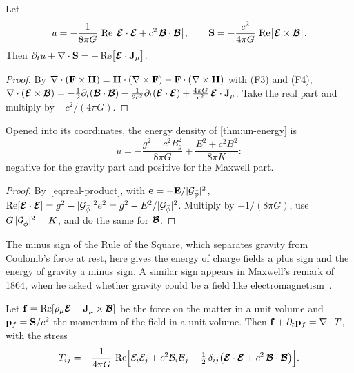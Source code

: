 \begin{theorem}\label{thm:un-energy}
Let
\[
u = -\frac{1}{8\pi G}\,\operatorname{Re}\bigl[\boldsymbol{\mathcal{E}}\cdot\boldsymbol{\mathcal{E}} + c^2\,\boldsymbol{\mathcal{B}}\cdot\boldsymbol{\mathcal{B}}\bigr], \qquad \mathbf{S} = -\frac{c^2}{4\pi G}\,\operatorname{Re}\bigl[\boldsymbol{\mathcal{E}}\times\boldsymbol{\mathcal{B}}\bigr].
\]
Then $\partial_t u + \nabla\cdot\mathbf{S} = -\operatorname{Re}\bigl[\boldsymbol{\mathcal{E}}\cdot\mathbf{J}_\mu\bigr]$.
\end{theorem}

\begin{proof}
By $\nabla\cdot(\mathbf{F}\times\mathbf{H}) = \mathbf{H}\cdot(\nabla\times\mathbf{F}) - \mathbf{F}\cdot(\nabla\times\mathbf{H})$ with (F3) and (F4),
$\nabla\cdot(\boldsymbol{\mathcal{E}}\times\boldsymbol{\mathcal{B}}) = -\tfrac12\partial_t(\boldsymbol{\mathcal{B}}\cdot\boldsymbol{\mathcal{B}}) - \tfrac{1}{2c^2}\partial_t(\boldsymbol{\mathcal{E}}\cdot\boldsymbol{\mathcal{E}}) + \tfrac{4\pi G}{c^2}\,\boldsymbol{\mathcal{E}}\cdot\mathbf{J}_\mu$. Take the real part and multiply by $-c^2/(4\pi G)$.
\end{proof}

\begin{proposition}\label{prop:un-two-faces}
Opened into its coordinates, the energy density of \cref{thm:un-energy} is
\[
u = -\frac{g^2 + c^2 B_g^2}{8\pi G} + \frac{E^2 + c^2 B^2}{8\pi K} :
\]
negative for the gravity part and positive for the Maxwell part.
\end{proposition}

\begin{proof}
By~\cref{eq:real-product}, with $\mathbf{e} = -\mathbf{E}/\lvert\mathcal{G}_{\bar{\phi}}\rvert^2$, $\operatorname{Re}[\boldsymbol{\mathcal{E}}\cdot\boldsymbol{\mathcal{E}}] = g^2 - \lvert\mathcal{G}_{\bar{\phi}}\rvert^2 e^2 = g^2 - E^2/\lvert\mathcal{G}_{\bar{\phi}}\rvert^2$. Multiply by $-1/(8\pi G)$, use $G\,\lvert\mathcal{G}_{\bar{\phi}}\rvert^2 = K$, and do the same for $\boldsymbol{\mathcal{B}}$.
\end{proof}

The minus sign of the Rule of the Square, which separates gravity from Coulomb's force at rest, here gives the energy of charge fields a plus sign and the energy of gravity a minus sign. A similar sign appears in Maxwell's remark of 1864, when he asked whether gravity could be a field like electromagnetism~\citep{Maxwell1865}.

\begin{theorem}\label{thm:un-momentum}
Let $\mathbf{f} = \operatorname{Re}[\rho_\mu\boldsymbol{\mathcal{E}} + \mathbf{J}_\mu\times\boldsymbol{\mathcal{B}}]$ be the force on the matter in a unit volume and $\mathbf{p}_f = \mathbf{S}/c^2$ the momentum of the field in a unit volume. Then $\mathbf{f} + \partial_t\mathbf{p}_f = \nabla\cdot T$, with the stress
\[
T_{ij} = -\frac{1}{4\pi G}\,\operatorname{Re}\Bigl[\mathcal{E}_i\mathcal{E}_j + c^2\mathcal{B}_i\mathcal{B}_j - \tfrac12\,\delta_{ij}\bigl(\boldsymbol{\mathcal{E}}\cdot\boldsymbol{\mathcal{E}} + c^2\,\boldsymbol{\mathcal{B}}\cdot\boldsymbol{\mathcal{B}}\bigr)\Bigr] .
\]
\end{theorem}

